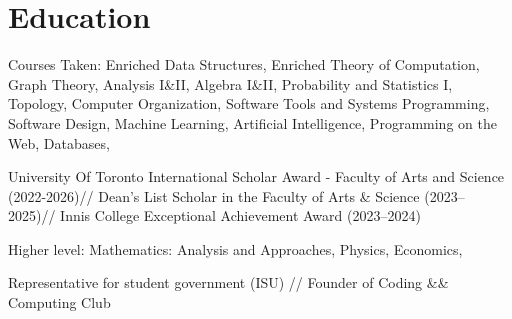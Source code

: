 \documentclass[letterpaper,10pt]{article}
\begin{document}

    \section{Education}

        \begin{resume_list}
            \item Courses Taken: Enriched Data Structures, Enriched Theory of Computation, Graph Theory, Analysis I\&II, Algebra I\&II, Probability and Statistics I, Topology, Computer Organization, Software Tools and Systems Programming, Software Design, Machine Learning, Artificial Intelligence, Programming on the Web, Databases, %
            \item University Of Toronto International Scholar Award - Faculty of Arts and Science (2022-2026)//
            Dean's List Scholar in the Faculty of Arts \& Science (2023--2025)//
            Innis College Exceptional Achievement Award (2023--2024)
        \end{resume_list}
    \vspace{5pt} 
    \begin{resume_list}
        \item Higher level: Mathematics: Analysis and Approaches, 
        Physics, Economics, 
        \item Representative for student government (ISU) // Founder of Coding \&\& Computing Club
    \end{resume_list}


\end{document}
